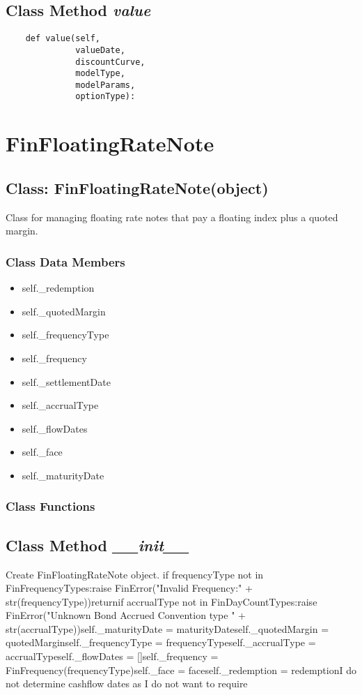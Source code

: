 \documentclass[twoside,11pt]{book}
\begin{document}
\subsection{Class Method {\it value}}


\begin{lstlisting}
    def value(self,
              valueDate,
              discountCurve,
              modelType,
              modelParams,
              optionType):
\end{lstlisting}

\newpage
\section{FinFloatingRateNote}

\subsection{Class: FinFloatingRateNote(object)}
Class for managing floating rate notes that pay a floating index plus a quoted margin.

\subsubsection{Class Data Members}
\begin{itemize}
\item{self.\_redemption}
\item{self.\_quotedMargin}
\item{self.\_frequencyType}
\item{self.\_frequency}
\item{self.\_settlementDate}
\item{self.\_accrualType}
\item{self.\_flowDates}
\item{self.\_face}
\item{self.\_maturityDate}
\end{itemize}

\subsubsection{Class Functions}

\subsection{Class Method {\it \_\_init\_\_}}
Create FinFloatingRateNote object. if frequencyType not in FinFrequencyTypes:raise FinError("Invalid Frequency:" + str(frequencyType))returnif accrualType not in FinDayCountTypes:raise FinError("Unknown Bond Accrued Convention type " + str(accrualType))self.\_maturityDate = maturityDateself.\_quotedMargin = quotedMarginself.\_frequencyType = frequencyTypeself.\_accrualType = accrualTypeself.\_flowDates = []self.\_frequency = FinFrequency(frequencyType)self.\_face = faceself.\_redemption = redemptionI do not determine cashflow dates as I do not want to require
\end{document}
